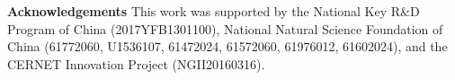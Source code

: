 \documentclass[10pt,twocolumn,letterpaper]{article}
\begin{document}
\vspace{0.2cm}
\noindent
\textbf{Acknowledgements}\quad
This work was supported by the National Key R\&D Program of China (2017YFB1301100), National Natural Science Foundation of China (61772060, U1536107, 61472024, 61572060, 61976012, 61602024), and the CERNET Innovation Project (NGII20160316).

{\small


}
\end{document}
